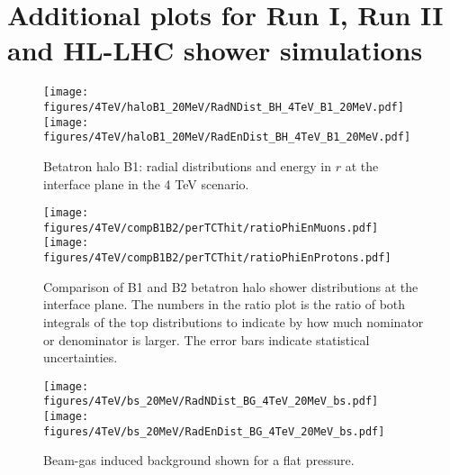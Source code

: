 \section{Additional plots for Run I, Run II and HL-LHC shower simulations\label{run1run2app}}


\begin{figure}[!htb]
\begin{center}

\texttt{[image: figures/4TeV/haloB1\_20MeV/RadNDist\_BH\_4TeV\_B1\_20MeV.pdf]}
\texttt{[image: figures/4TeV/haloB1\_20MeV/RadEnDist\_BH\_4TeV\_B1\_20MeV.pdf]}

\end{center}
\vspace{-0.6cm}
 \caption{Betatron halo B1: radial distributions and energy in $r$ at the interface plane in the 4 TeV scenario. 
  \label{dist4TeVB12}}
\end{figure}

\begin{figure}[!htb]
\begin{center}
\texttt{[image: figures/4TeV/compB1B2/perTCThit/ratioPhiEnMuons.pdf]}
\texttt{[image: figures/4TeV/compB1B2/perTCThit/ratioPhiEnProtons.pdf]}
\end{center}
\vspace{-0.6cm}
\caption{Comparison of B1 and B2 betatron halo shower distributions at the interface plane. The numbers in the ratio plot is the ratio of both integrals of the top distributions to indicate by how much nominator or denominator is larger. The error bars indicate statistical uncertainties.
  \label{comp4TeVB1B2}}
\end{figure}


\begin{figure}%
\begin{center}
\texttt{[image: figures/4TeV/bs\_20MeV/RadNDist\_BG\_4TeV\_20MeV\_bs.pdf]}
\texttt{[image: figures/4TeV/bs\_20MeV/RadEnDist\_BG\_4TeV\_20MeV\_bs.pdf]}
\end{center}
\vspace{-0.6cm}
 \caption{Beam-gas induced background shown for a flat pressure.
  \label{dist4TeVBGbs2}}
\end{figure}

